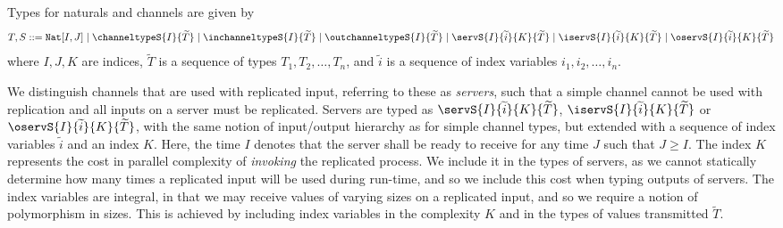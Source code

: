 \begin{defi}[Types] Types for naturals and channels are given by
\begin{align*}
    \kern0em T,S ::= \texttt{Nat}[I,J] \mid \channeltypeS{I}{\widetilde{T}} \mid \inchanneltypeS{I}{\widetilde{T}} \mid \outchanneltypeS{I}{\widetilde{T}} \mid \servS{I}{\widetilde{i}}{K}{\widetilde{T}} \mid \iservS{I}{\widetilde{i}}{K}{\widetilde{T}} \mid \oservS{I}{\widetilde{i}}{K}{\widetilde{T}}
\end{align*}
where $I,J,K$ are indices, $\widetilde{T}$ is a sequence of types $T_1,T_2,\dots,T_n$, and $\widetilde{i}$ is a sequence of index variables $i_1,i_2,\dots,i_n$.
\label{def:sizedcomptypes}
\end{defi}

We distinguish channels that are used with replicated input, referring to these as \textit{servers}, such that a simple channel cannot be used with replication and all inputs on a server must be replicated. Servers are typed as $\servS{I}{\widetilde{i}}{K}{\widetilde{T}}$, $\iservS{I}{\widetilde{i}}{K}{\widetilde{T}}$ or $\oservS{I}{\widetilde{i}}{K}{\widetilde{T}}$, with the same notion of input/output hierarchy as for simple channel types, but extended with a sequence of index variables $\widetilde{i}$ and an index $K$. Here, the time $I$ denotes that the server shall be ready to receive for any time $J$ such that $J \geq I$. The index $K$ represents the cost in parallel complexity of \textit{invoking} the replicated process. We include it in the types of servers, as we cannot statically determine how many times a replicated input will be used during run-time, and so we include this cost when typing outputs of servers. The index variables are integral, in that we may receive values of varying sizes on a replicated input, and so we require a notion of polymorphism in sizes. This is achieved by including index variables in the complexity $K$ and in the types of values transmitted $\widetilde{T}$.\\

